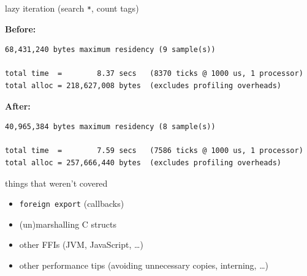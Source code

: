 \documentclass[ignorenonframetext,aspectratio=169]{beamer}
\providecommand{\tightlist}{%
  \setlength{\itemsep}{0pt}\setlength{\parskip}{0pt}}
\begin{document}
\begin{frame}[fragile]{lazy iteration (search \texttt{*}, count tags)}

{\bf Before:}

\begin{verbatim}
68,431,240 bytes maximum residency (9 sample(s))

total time  =        8.37 secs   (8370 ticks @ 1000 us, 1 processor)
total alloc = 218,627,008 bytes  (excludes profiling overheads)
\end{verbatim}

{\bf After:}

\begin{verbatim}
40,965,384 bytes maximum residency (8 sample(s))

total time  =        7.59 secs   (7586 ticks @ 1000 us, 1 processor)
total alloc = 257,666,440 bytes  (excludes profiling overheads)
\end{verbatim}

\end{frame}

\begin{frame}{things that weren't covered}
\begin{itemize}
\tightlist
\item
    \texttt{foreign export} (callbacks)
\item
  (un)marshalling C structs
\item
  other FFIs (JVM, JavaScript, \ldots)
\item
  other performance tips (avoiding unnecessary copies, interning, \ldots)
\end{itemize}
\end{frame}
\end{document}
